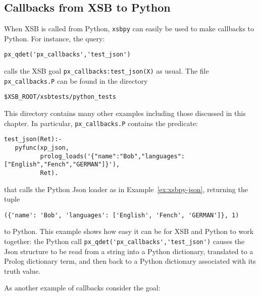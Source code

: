 \subsection{Callbacks from XSB to Python} \label{sec:callbacks}

When XSB is called from Python, {\tt xsbpy} can easily be used to make
callbacks to Python.  For instance, the query:

\begin{verbatim}
px_qdet('px_callbacks','test_json')
\end{verbatim}

\noindent
calls the XSB goal {\tt px\_callbacks:test\_json(X)} as usual.  The
file {\tt px\_callbacks.P} can be found in the directory

\verb|$XSB_ROOT/xsbtests/python_tests|

\noindent
This directory contains many other examples including those discussed
in this chapter.  In particular, {\tt px\_callbacks.P} contains the
predicate:

\begin{verbatim}
test_json(Ret):- 
   pyfunc(xp_json,
          prolog_loads('{"name":"Bob","languages": ["English","Fench","GERMAN"]}'),
          Ret).
\end{verbatim}

\noindent
that calls the Python Json loader as in Example~\ref{ex:xsbpy-json}, returning the tuple
\begin{verbatim}
({'name': 'Bob', 'languages': ['English', 'Fench', 'GERMAN']}, 1)
\end{verbatim}
to Python.  This example shows how easy it can be for XSB and Python
to work together: the Python call
\verb|px_qdet('px_callbacks','test_json')| causes the Json structure
to be read from a string into a Python dictionary, translated to a
Prolog dictionary term, and then back to a Python dictionary
associated with its truth value.

As another example of callbacks consider the goal:


